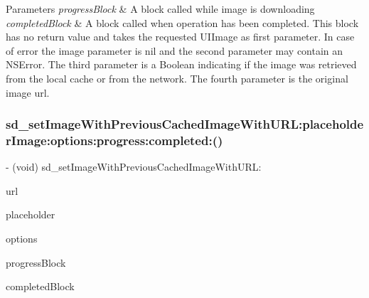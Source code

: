 \begin{DoxyParams}{Parameters}
{\em progress\+Block} & A block called while image is downloading \\
\hline
{\em completed\+Block} & A block called when operation has been completed. This block has no return value and takes the requested U\+I\+Image as first parameter. In case of error the image parameter is nil and the second parameter may contain an N\+S\+Error. The third parameter is a Boolean indicating if the image was retrieved from the local cache or from the network. The fourth parameter is the original image url. \\
\hline
\end{DoxyParams}
\mbox{\label{category_u_i_image_view_07_web_cache_08_a80c34aa94dae003b0f2fd61ddf85becf}} 
\subsubsection{\texorpdfstring{sd\+\_\+set\+Image\+With\+Previous\+Cached\+Image\+With\+U\+R\+L\+:placeholder\+Image\+:options\+:progress\+:completed\+:()}{sd\_setImageWithPreviousCachedImageWithURL:placeholderImage:options:progress:completed:()}\hspace{0.1cm}{\footnotesize\ttfamily [2/3]}}
{\footnotesize\ttfamily -\/ (void) sd\+\_\+set\+Image\+With\+Previous\+Cached\+Image\+With\+U\+R\+L\+: \begin{DoxyParamCaption}\item[{(N\+S\+U\+RL $\ast$)}]{url }\item[{placeholderImage:(U\+I\+Image $\ast$)}]{placeholder }\item[{options:(S\+D\+Web\+Image\+Options)}]{options }\item[{progress:(S\+D\+Web\+Image\+Downloader\+Progress\+Block)}]{progress\+Block }\item[{completed:(S\+D\+Web\+Image\+Completion\+Block)}]{completed\+Block }\end{DoxyParamCaption}}

